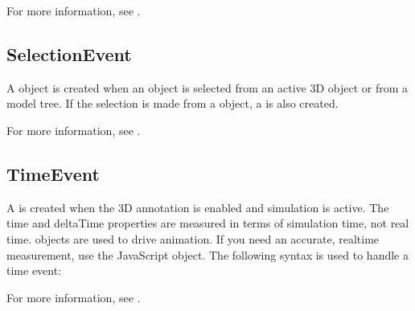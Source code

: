 \documentclass[letterpaper,12pt,english,openany,oneside]{sphinxmanual}
\begin{document}
For more information, see .


\subsection{SelectionEvent}
\label{\detokenize{index:selectionevent}}
A  object is created when an object is selected from an active 3D  object or from a model tree. If the selection is made from a  object, a  is also created.

For more information, see .


\subsection{TimeEvent}
\label{\detokenize{index:timeevent}}
A  is created when the 3D annotation is enabled and simulation is active. The time and deltaTime properties are measured in terms of simulation time, not real time.  objects are used to drive animation. If you need an accurate, real\sphinxhyphen{}time measurement, use the JavaScript  object. The following syntax is used to handle a time event:

\begin{sphinxVerbatim}[commandchars=\\\{\}]
                
          
         
       
   
\end{sphinxVerbatim}

For more information, see .
\end{document}
